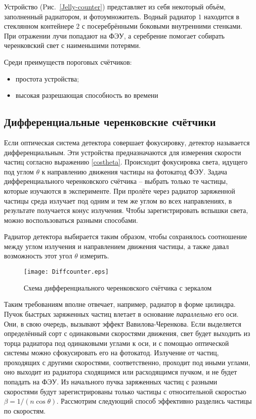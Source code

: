 \begin{Diplom-Main}
	Устройство (Pис.~\ref{Jelly-counter}) представляет из себя некоторый объём, заполненный радиатором, и фотоумножитель. Водный радиатор $ 1 $ находится в стеклянном контейнере $ 2 $ с посеребрёнными боковыми внутренними стенками. При отражении лучи попадают на ФЭУ, а серебрение помогает собирать черенковский свет с наименьшими потерями.
	
	Среди преимуществ пороговых счётчиков:
	\begin{itemize}
		\item простота устройства;
		\item высокая разрешающая способность во времени
	\end{itemize}
	
	\subsection{Дифференциальные черенковские счётчики}
	\label{sec:subsection}
	
	Если оптическая система детектора совершает фокусировку, детектор называется дифференциальным. Эти устройства предназначаются для измерения скорости частиц согласно выражению {\eqref{costheta}}.
	Происходит фокусировка света, идущего под углом $ \theta $ к направлению движения частицы на фотокатод ФЭУ. Задача дифференциального черенковского счётчика -- выбрать только те частицы, которые изучаются в эксперименте. 
	При пролёте через радиатор заряженной частицы среда излучает под одним и тем же углом во всех направлениях, в результате получается конус излучения.
	Чтобы зарегистрировать вспышки света, можно воспользоваться разными способами.
	
	 Радиатор детектора выбирается таким образом, чтобы сохранялось соотношение между углом излучения и направлением движения частицы, а также давал возможность этот угол $ \theta $ измерить.
	 \begin{figure}
	 	\noindent
	 	\hfil
	 	\texttt{[image: Diffcounter.eps]}
	 	\hfil
	 	\caption{Схема дифференциального черенковского счётчика с зеркалом}
	 	\label{diffscheme}
	 \end{figure}
	Таким требованиям вполне отвечает, например, радиатор в форме цилиндра. Пучок быстрых заряженных частиц влетает в основание \textit{параллельно} его оси.
	Они, в свою очередь, вызывают эффект Вавилова-Черенкова. Если выделяется определённый сорт с одинаковыми скоростями движения, свет будет выходить из торца радиатора под одинаковыми углами к оси, и с помощью оптической системы можно сфокусировать его на фотокатод. 
	Излучение от частиц, проходящих с другими скоростями, соответственно, проходит под иными углами, оно выходит из радиатора сходящимся или расходящимся пучком, и не будет попадать на ФЭУ.
	Из начального пучка заряженных частиц с разными скоростями будут зарегистрированы только частицы с относительной скоростью $\beta = 1/(n \cos{\theta}) $. Рассмотрим следующий способ эффективно разделись частицы по скоростям.
	

\end{Diplom-Main}

